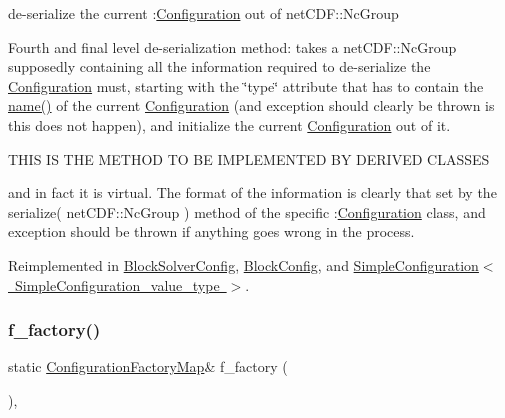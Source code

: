 de-\/serialize the current \+:\mbox{\hyperlink{class_s_m_spp__di__unipi__it_1_1_configuration}{Configuration}} out of net\+C\+D\+F\+::\+Nc\+Group 

Fourth and final level de-\/serialization method\+: takes a net\+C\+D\+F\+::\+Nc\+Group supposedly containing all the information required to de-\/serialize the \mbox{\hyperlink{class_s_m_spp__di__unipi__it_1_1_configuration}{Configuration}} must, starting with the \char`\"{}type\char`\"{} attribute that has to contain the \mbox{\hyperlink{class_s_m_spp__di__unipi__it_1_1_configuration_a738e9dfd6e00507da219e4bd5a3f6be9}{name()}} of the current \mbox{\hyperlink{class_s_m_spp__di__unipi__it_1_1_configuration}{Configuration}} (and exception should clearly be thrown is this does not happen), and initialize the current \mbox{\hyperlink{class_s_m_spp__di__unipi__it_1_1_configuration}{Configuration}} out of it. \begin{DoxyVerb} THIS IS THE METHOD TO BE IMPLEMENTED BY DERIVED CLASSES
\end{DoxyVerb}


and in fact it is virtual. The format of the information is clearly that set by the serialize( net\+C\+D\+F\+::\+Nc\+Group ) method of the specific \+:\mbox{\hyperlink{class_s_m_spp__di__unipi__it_1_1_configuration}{Configuration}} class, and exception should be thrown if anything goes wrong in the process. 

Reimplemented in \mbox{\hyperlink{class_s_m_spp__di__unipi__it_1_1_block_solver_config_a828ece608e8a4a497f43d3d6bb75af40}{Block\+Solver\+Config}}, \mbox{\hyperlink{class_s_m_spp__di__unipi__it_1_1_block_config_a828ece608e8a4a497f43d3d6bb75af40}{Block\+Config}}, and \mbox{\hyperlink{class_s_m_spp__di__unipi__it_1_1_simple_configuration_a828ece608e8a4a497f43d3d6bb75af40}{Simple\+Configuration$<$ Simple\+Configuration\+\_\+value\+\_\+type $>$}}.

\mbox{\label{class_s_m_spp__di__unipi__it_1_1_configuration_ac70d8005924aa4472f10d6f581ed148d}} 
\subsubsection{\texorpdfstring{f\+\_\+factory()}{f\_factory()}}
{\footnotesize\ttfamily static \mbox{\hyperlink{class_s_m_spp__di__unipi__it_1_1_configuration_aee2d0ed361f8089096aa45ffa2f07bed}{Configuration\+Factory\+Map}}\& f\+\_\+factory (\begin{DoxyParamCaption}\item[{void}]{ }\end{DoxyParamCaption})\hspace{0.3cm}{\ttfamily [static]}, {\ttfamily [protected]}}



